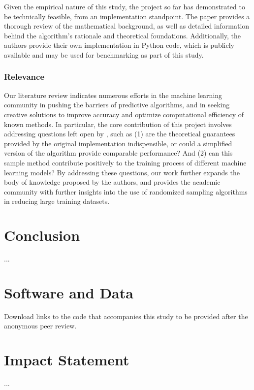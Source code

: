 \documentclass{article}
\theoremstyle{plain}
\theoremstyle{definition}
\theoremstyle{remark}
\begin{document}
Given the empirical nature of this study, the project so far has demonstrated to be technically feasible, from an implementation standpoint. The paper \cite{chow24} provides a thorough review of the mathematical background, as well as detailed information behind the algorithm's rationale and theoretical foundations. Additionally, the authors provide their own implementation in Python code, which is publicly available and may be used for benchmarking as part of this study.


\subsubsection{Relevance}

Our literature review indicates numerous efforts in the machine learning community in pushing the barriers of predictive algorithms, and in seeking creative solutions to improve accuracy and optimize computational efficiency of known methods. In particular, the core contribution of this project involves addressing questions left open by \citeauthor{chow24}, such as (1) are the theoretical guarantees provided by the original implementation indispensible, or could a simplified version of the algorithm provide comparable performance? And (2) can this sample method contribute positively to the training process of different machine learning models? By addressing these questions, our work further expands the body of knowledge proposed by the authors, and provides the academic community with further insights into the use of randomized sampling algorithms in reducing large training datasets.


\section{Conclusion}

...


\section*{Software and Data}

Download links to the code that accompanies this study to be provided after the anonymous peer review.

\section*{Impact Statement}

...
\end{document}
